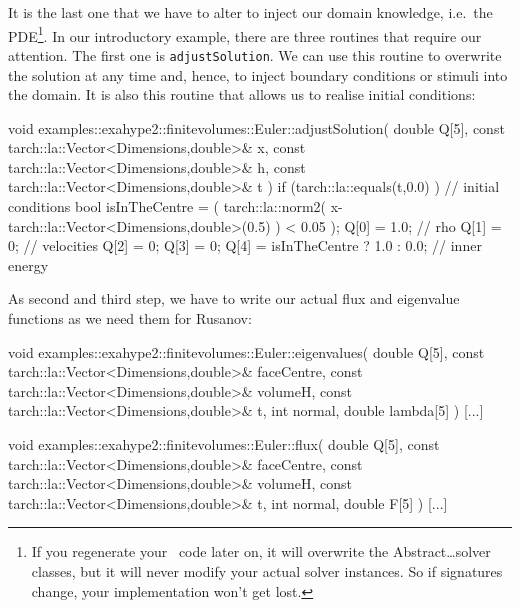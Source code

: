 \noindent
It is the last one that we have to alter to inject our domain knowledge,
i.e.~the PDE\footnote{If you regenerate your \ExaHyPE\ code later on, it will
overwrite the Abstract\ldots solver classes, but it will never modify your
actual solver instances. So if signatures change, your implementation won't
get lost.}.
In our introductory example, there are three routines that require our
attention.
The first one is \texttt{adjustSolution}.
We can use this routine to overwrite the solution at any time and, hence, to
inject boundary conditions or stimuli into the domain.
It is also this routine that allows us to realise initial conditions:
\begin{code}
void examples::exahype2::finitevolumes::Euler::adjustSolution(
  double Q[5],
  const tarch::la::Vector<Dimensions,double>&  x,
  const tarch::la::Vector<Dimensions,double>&  h,
  const tarch::la::Vector<Dimensions,double>&  t
) {
  if (tarch::la::equals(t,0.0) ) {
    // initial conditions
    bool isInTheCentre = ( tarch::la::norm2( x-tarch::la::Vector<Dimensions,double>(0.5) ) < 0.05 );
    Q[0] = 1.0;  // rho
    Q[1] = 0;    // velocities
    Q[2] = 0;
    Q[3] = 0;
    Q[4] = isInTheCentre ? 1.0 : 0.0; // inner energy
  }
}
\end{code}


\noindent
As second and third step, we have to write our actual flux and eigenvalue
functions as we need them for Rusanov:


\begin{code}
void examples::exahype2::finitevolumes::Euler::eigenvalues(
  double                                       Q[5],
  const tarch::la::Vector<Dimensions,double>&  faceCentre,
  const tarch::la::Vector<Dimensions,double>&  volumeH,
  const tarch::la::Vector<Dimensions,double>&  t,
  int                                          normal,
  double                                       lambda[5]
) {
  [...]
}
\end{code}





\begin{code}
void examples::exahype2::finitevolumes::Euler::flux(
  double                                       Q[5],
  const tarch::la::Vector<Dimensions,double>&  faceCentre,
  const tarch::la::Vector<Dimensions,double>&  volumeH,
  const tarch::la::Vector<Dimensions,double>&  t,
  int                                          normal,
  double                                       F[5]
) {
  [...]
}
\end{code}


